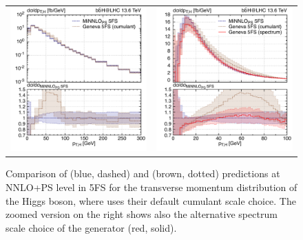 \documentclass[11pt,a4paper]{article}
\begin{document}
\begin{figure}[t!]
\begin{center}
\begin{tabular}{cc}
\includegraphics[width=.45\textwidth, page=1]{plots/5fs/genevaminnlo/minnloKQvar-geneva-ptH.pdf}&
\includegraphics[width=.45\textwidth, page=1]{plots/5fs/genevaminnlo/minnloKQvar-genevaspec-ptHzoom.pdf}
\end{tabular}
\vspace*{1ex}
\caption{Comparison of \minnlo{} (blue, dashed) and \GENEVA{} (brown, dotted) predictions at NNLO+PS level in 5FS for the transverse momentum distribution of the Higgs boson, where \GENEVA{} uses their default cumulant scale choice. The zoomed version on the right shows also the alternative spectrum scale choice of the \GENEVA{} generator (red, solid).\label{fig:genevaptH}}
\end{center}
\end{figure}
\end{document}
